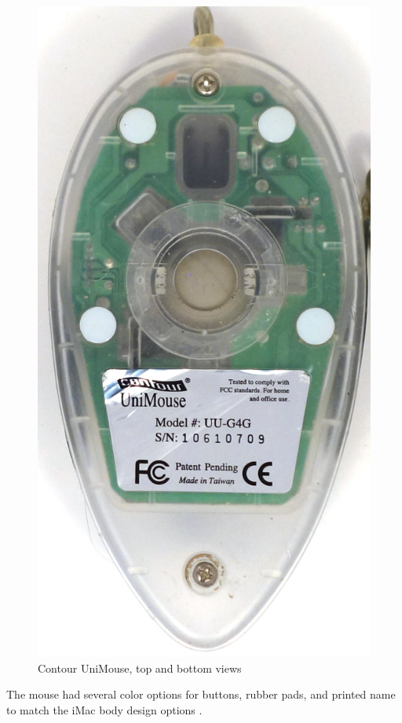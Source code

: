 \documentclass[11pt, a4paper]{article}
\begin{document}
\begin{figure}[h]
    \includegraphics[scale=0.48]{1999_contour_unimouse/bottom_30.jpg}
    \caption{Contour UniMouse, top and bottom views}
    \label{fig:ContourUniMouseTopAndBottom}
\end{figure}

The mouse had several color options for buttons, rubber pads, and printed name to match the iMac body design options \cite{web}.
\end{document}
